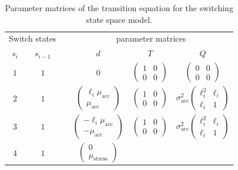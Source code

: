 \documentclass[aoas]{imsart}
\begin{document}
\begin{table}
  \caption{Parameter matrices of the transition equation for the switching state space model.\label{tab:parmats}}
\centering
\begin{tabular}[h!]{@{}cccccc@{}}
\toprule
  \multicolumn{2}{c}{Switch states} &\phantom{a}& \multicolumn{3}{c}{parameter
                                      matrices}\\
  \cmidrule{1-2} \cmidrule{4-6}
  $s_i$ & $s_{i-1}$ && $d$ & $T$ & $Q$ \\
  \midrule
  $1$ &  $1$ && 0 & $\begin{pmatrix}1&0\\0&0\end{pmatrix}$ 
                 & $\begin{pmatrix}0&0\\0&0\end{pmatrix}$\\
  $2$ & $1$ && $\begin{pmatrix} \ell_i\mu_{\textrm{acc}}\\ \mu_{\textrm{acc}}\end{pmatrix}$ 
                                    & $\begin{pmatrix} 1 & 0 \\ 0 &
                                      0 \end{pmatrix}$ 
   & $\sigma_{\textrm{acc}}^2\begin{pmatrix} \ell_i^2 & \ell_i\\ \ell_i & 1 \end{pmatrix}$\\
  $3$ & $1$ && $\begin{pmatrix} -\ell_i\mu_{\textrm{acc}}\\ -\mu_{\textrm{acc}}\end{pmatrix}$ 
                                    & $\begin{pmatrix} 1 & 0 \\ 0 &
                                      0 \end{pmatrix}$ 
        & $\sigma_{\textrm{acc}}^2\begin{pmatrix} \ell_i^2 & \ell_i\\ \ell_i & 1 \end{pmatrix}$\\
  $4$ & $1$ && $\begin{pmatrix}0\\\mu_{\textrm{stress}}\end{pmatrix}$ 

\end{tabular}
\end{table}
\end{document}
